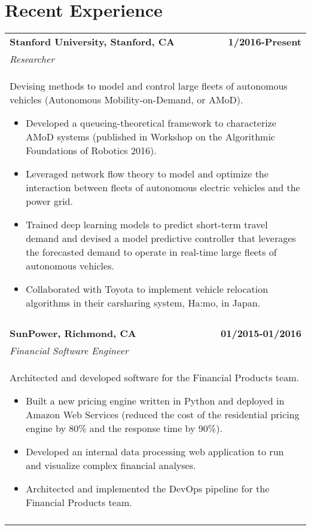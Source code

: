\documentclass[a4paper,10pt]{article}
\begin{document}
\section{Recent Experience}
\begin{tabularx}{\textwidth}{Xr}

 \bf{Stanford University}, Stanford, CA & \bf{1/2016-Present}\\
 \emph{Researcher} &\\
 \multicolumn{2}{p{0.98\textwidth}}{
 Devising methods to model and control large fleets of autonomous vehicles (Autonomous Mobility-on-Demand, or AMoD). 
 \begin{itemize}
 	\item Developed a queueing-theoretical framework to characterize AMoD systems (published in Workshop on the Algorithmic Foundations of Robotics 2016).
 	\item Leveraged network flow theory to model and optimize the interaction between fleets of autonomous electric vehicles and the power grid.
 	\item Trained deep learning models to predict short-term travel demand and devised a model predictive controller that leverages the forecasted demand to operate in real-time large fleets of autonomous vehicles.
 	\item Collaborated with Toyota to implement vehicle relocation algorithms in their carsharing system, Ha:mo, in Japan.
 \end{itemize}
 }\\
 \multicolumn{2}{c}{} \\

\bf{SunPower}, Richmond, CA & \bf{01/2015-01/2016}\\
\emph{Financial Software Engineer} &\\
\multicolumn{2}{p{0.98\textwidth}}{
Architected and developed software for the Financial Products team. 
\begin{itemize}
	\item Built a new pricing engine written in Python and deployed in Amazon Web Services (reduced the cost of the residential pricing engine by 80\% and the response time by 90\%).
	\item Developed an internal data processing web application to run and visualize complex financial analyses.
	\item Architected and implemented the DevOps pipeline for the Financial Products team.
\end{itemize}
}\\
\multicolumn{2}{X}{} \\


\end{tabularx}
\end{document}
